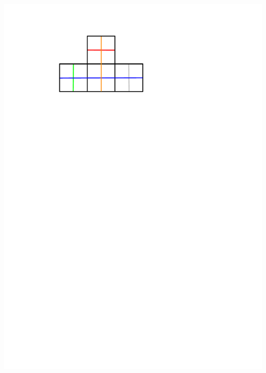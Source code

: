 \documentclass[portrait,final,a0paper,fontscale=0.25]{baposter}
\theoremstyle{definition}
\begin{document}
\begin{poster}
{\hspace*{.1cm}\includegraphics[scale=.3]{StraightWalks}
}
\end{poster}
\end{document}
